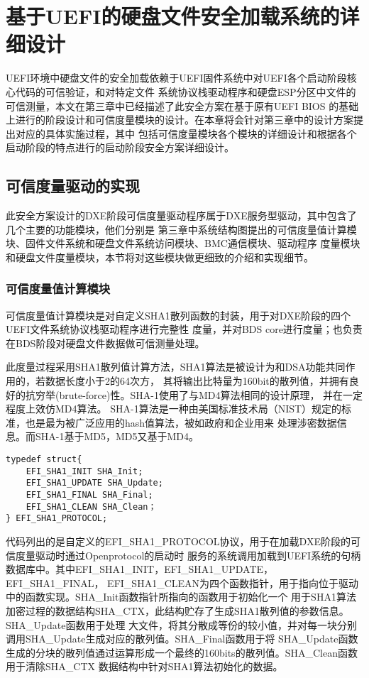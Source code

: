 %
%
\chapter{基于UEFI的硬盘文件安全加载系统的详细设计}
UEFI环境中硬盘文件的安全加载依赖于UEFI固件系统中对UEFI各个启动阶段核心代码的可信验证，和对特定文件
系统协议栈驱动程序和硬盘ESP分区中文件的可信测量，本文在第三章中已经描述了此安全方案在基于原有UEFI BIOS
的基础上进行的阶段设计和可信度量模块的设计。在本章将会针对第三章中的设计方案提出对应的具体实施过程，其中
包括可信度量模块各个模块的详细设计和根据各个启动阶段的特点进行的启动阶段安全方案详细设计。

%
%
\section{可信度量驱动的实现}
此安全方案设计的DXE阶段可信度量驱动程序属于DXE服务型驱动，其中包含了几个主要的功能模块，他们分别是
第三章中系统结构图提出的可信度量值计算模块、固件文件系统和硬盘文件系统访问模块、BMC通信模块、驱动程序
度量模块和硬盘文件度量模块，本节将对这些模块做更细致的介绍和实现细节。

\subsection{可信度量值计算模块}
可信度量值计算模块是对自定义SHA1散列函数的封装，用于对DXE阶段的四个UEFI文件系统协议栈驱动程序进行完整性
度量，并对BDS core进行度量；也负责在BDS阶段对硬盘文件数据做可信测量处理。
\par 此度量过程采用SHA1散列值计算方法，SHA1算法是被设计为和DSA功能共同作用的，若数据长度小于2的64次方，
其将输出比特量为160bit的散列值，并拥有良好的抗穷举(brute-force)性。SHA-1使用了与MD4算法相同的设计原理，
并在一定程度上效仿MD4算法。
SHA-1算法是一种由美国标准技术局（NIST）规定的标准，也是最为被广泛应用的hash值算法，被如政府和企业用来
处理涉密数据信息。而SHA-1基于MD5，MD5又基于MD4。

\begin{lstlisting}
typedef struct{
    EFI_SHA1_INIT SHA_Init;
    EFI_SHA1_UPDATE SHA_Update;
    EFI_SHA1_FINAL SHA_Final;
    EFI_SHA1_CLEAN SHA_Clean；
} EFI_SHA1_PROTOCOL;
\end{lstlisting}

代码列出的是自定义的EFI\_SHA1\_PROTOCOL协议，用于在加载DXE阶段的可信度量驱动时通过Openprotocol的启动时
服务的系统调用加载到UEFI系统的句柄数据库中。其中EFI\_SHA1\_INIT，EFI\_SHA1\_UPDATE，EFI\_SHA1\_FINAL，
EFI\_SHA1\_CLEAN为四个函数指针，用于指向位于驱动中的函数实现。SHA\_Init函数指针所指向的函数用于初始化一个
用于SHA1算法加密过程的数据结构SHA\_CTX，此结构贮存了生成SHA1散列值的参数信息。SHA\_Update函数用于处理
大文件，将其分散成等份的较小值，并对每一块分别调用SHA\_Update生成对应的散列值。SHA\_Final函数用于将
SHA\_Update函数生成的分块的散列值通过运算形成一个最终的160bits的散列值。SHA\_Clean函数用于清除SHA\_CTX
数据结构中针对SHA1算法初始化的数据。

